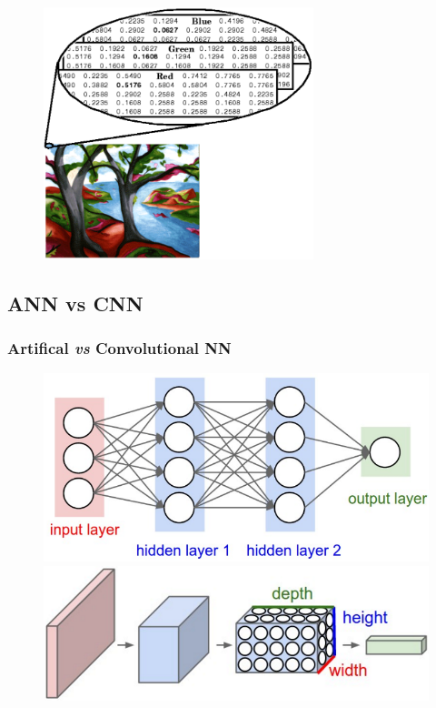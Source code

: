 \documentclass{beamer}
\begin{document}
\begin{frame}
\begin{minipage}{0.45\textwidth}
	\end{minipage} \\
	\begin{minipage}{0.60\textwidth}	 				\begin{figure} 									\includegraphics[width=0.7\textwidth]{./figures/edit/rgb_sample.png} 
		\end{figure}
			
	\end{minipage}
\end{frame}

\subsection{ANN vs CNN}

\begin{frame}
	\frametitle{Artifical \textit{vs} Convolutional NN}
	\begin{figure}
		\includegraphics[scale=0.30]{./figures/edit/ann.png} \\
		\includegraphics[scale=0.32]{./figures/edit/cnn.png} 
	\end{figure}
\end{frame}
\end{document}
